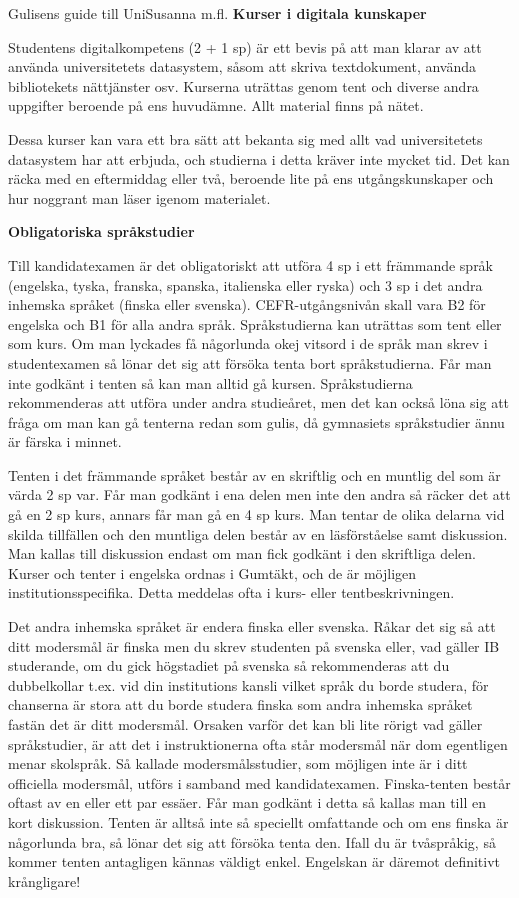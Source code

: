 \documentclass{spektraklet}
\begin{document}
\begin{artikel}{Gulisens guide till Uni}{Susanna m.fl.}
\textbf{Kurser i digitala kunskaper}

Studentens digitalkompetens (2 + 1 sp) är ett bevis på att man klarar av att använda universitetets datasystem, såsom att skriva textdokument, använda bibliotekets nättjänster osv. Kurserna uträttas genom tent och diverse andra uppgifter beroende på ens huvudämne. Allt material finns på nätet.

Dessa kurser kan vara ett bra sätt att bekanta sig med allt vad universitetets datasystem har att erbjuda, och studierna i detta kräver inte mycket tid. Det kan räcka med en eftermiddag eller två, beroende lite på ens utgångskunskaper och hur noggrant man läser igenom materialet. 

\textbf{Obligatoriska språkstudier}

Till kandidatexamen är det obligatoriskt att utföra 4 sp i ett främmande språk (engelska, tyska, franska, spanska, italienska eller ryska) och 3 sp i det andra inhemska språket (finska eller svenska). CEFR-utgångsnivån skall vara B2 för engelska och B1 för alla andra språk. Språkstudierna kan uträttas som tent eller som kurs. 
Om man lyckades få någorlunda okej vitsord i de språk man skrev i studentexamen så lönar det sig att försöka tenta bort språkstudierna. Får man inte godkänt i tenten så kan man alltid gå kursen. Språkstudierna rekommenderas att utföra under andra studieåret, men det kan också löna sig att fråga om man kan gå tenterna redan som gulis, då gymnasiets språkstudier ännu är färska i minnet.

Tenten i det främmande språket består av en skriftlig och en muntlig del som är värda 2 sp var. Får man godkänt i ena delen men inte den andra så räcker det att gå en 2 sp kurs, annars får man gå en 4 sp kurs. Man tentar de olika delarna vid skilda tillfällen och den muntliga delen består av en läsförståelse samt diskussion. Man kallas till diskussion endast om man fick godkänt i den skriftliga delen. Kurser och tenter i engelska
ordnas i Gumtäkt, och de är möjligen institutionsspecifika. Detta meddelas ofta i kurs- eller tentbeskrivningen.

Det andra inhemska språket är endera finska eller svenska. Råkar det sig så att ditt
modersmål är finska men du skrev studenten på svenska eller, vad gäller IB studerande, om du gick högstadiet på svenska så rekommenderas att du dubbelkollar t.ex. vid din institutions kansli vilket språk du borde studera, för chanserna är stora att du borde studera finska som andra inhemska språket fastän det är ditt modersmål. Orsaken varför det kan bli lite rörigt vad gäller språkstudier, är att det i instruktionerna ofta står modersmål när dom egentligen menar skolspråk. Så kallade modersmålsstudier, som möjligen inte är i ditt officiella modersmål, utförs i samband med kandidatexamen. 
Finska-tenten består oftast av en eller ett par essäer. Får man godkänt i detta så kallas man till en kort diskussion. Tenten är alltså inte så speciellt omfattande och om ens finska är någorlunda bra, så lönar det sig att försöka tenta den. Ifall du är tvåspråkig, så kommer tenten antagligen kännas väldigt enkel. Engelskan är däremot definitivt krångligare!



\end{artikel}
\end{document}

